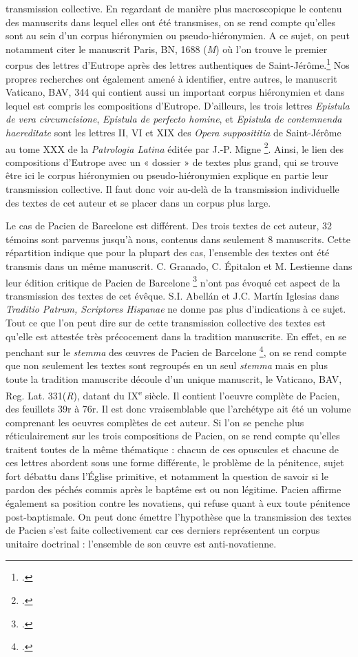 \documentclass[a4paper,twoside,12pt]{book}
\begin{document}
transmission collective. En regardant de manière plus macroscopique le contenu des manuscrits dans lequel elles ont été transmises, on se rend compte qu’elles sont au sein d’un corpus hiéronymien ou pseudo-hiéronymien. A ce sujet, on peut notamment citer le manuscrit Paris, BN, 1688 (\textit{M}) où l’on trouve le premier corpus des lettres d’Eutrope après des lettres authentiques
de Saint-Jérôme.\footcite[p. 379]{Courcelle} Nos propres recherches ont également amené à identifier, entre autres, le manuscrit Vaticano, BAV, 344 qui contient aussi un important corpus hiéronymien et dans lequel est compris les compositions d’Eutrope. D’ailleurs,  les trois lettres \textit{Epistula de vera circumcisione}, \textit{Epistula de perfecto homine}, et \textit{Epistula de contemnenda haereditate} sont les lettres II,  VI et XIX des \textit {Opera supposititia} de Saint-Jérôme  au tome XXX de la  \textit{Patrologia Latina}  éditée par J.-P. Migne \footcite{migneCollection}. Ainsi, le lien des compositions d’Eutrope  avec un « dossier » de textes plus grand, qui se trouve être ici le corpus hiéronymien ou pseudo-hiéronymien explique en partie leur transmission collective. Il faut donc voir au-delà de la transmission individuelle des textes de cet auteur et se placer dans un corpus plus large.

Le cas de Pacien de Barcelone est différent. Des trois textes de cet auteur, 32 témoins sont parvenus jusqu’à nous, contenus dans seulement 8 manuscrits. Cette répartition indique que pour la plupart des cas, l'ensemble des textes ont été transmis dans un même manuscrit. C. Granado, C. Épitalon et M. Lestienne dans leur édition critique de Pacien de Barcelone \footcite{Granado} n'ont pas évoqué cet aspect de la transmission des textes de cet évêque. S.I. Abellán et J.C. Martín Iglesias dans \textit{Traditio Patrum, Scriptores Hispanae} ne donne pas plus d’indications à ce sujet. Tout ce que l’on peut dire sur de cette transmission collective des textes est qu’elle est attestée très précocement dans la tradition manuscrite. En effet, en se penchant sur le \textit{stemma} des œuvres de Pacien de Barcelone \footcite [p. 366]{TradPat}, on se rend compte que non seulement les textes sont regroupés en un seul \textit{stemma} mais en plus toute la tradition manuscrite découle d’un unique manuscrit, le Vaticano, BAV, Reg. Lat. 331(\textit{R}), datant du IX\textsuperscript{e} siècle. Il contient l’oeuvre complète de Pacien, des feuillets 39r à 76r.  Il est donc vraisemblable que l'archétype ait été un volume comprenant les oeuvres complètes de cet auteur. Si l’on se penche plus réticulairement sur les trois compositions de Pacien, on se rend compte qu’elles traitent toutes de la même thématique : chacun de ces opuscules et chacune de ces lettres abordent sous une forme différente, le problème de la pénitence, sujet fort débattu dans l'Église primitive, et notamment la question de savoir si le pardon des péchés commis après le baptême est ou non légitime. Pacien affirme également sa position contre les novatiens, qui refuse quant à eux toute pénitence post-baptismale. On peut donc émettre l’hypothèse que la transmission des textes de Pacien s’est faite collectivement car ces derniers représentent un corpus unitaire doctrinal : l’ensemble de son œuvre est anti-novatienne. 
\end{document}
